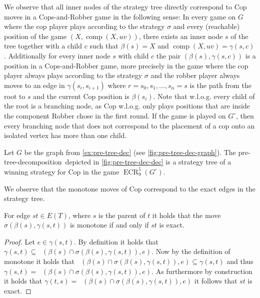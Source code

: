 \documentclass{lmcs}
\theoremstyle{plain}\newtheorem{claim}[thm]{Claim}   %
\DeclareMathOperator{\eCR}{ECR}
\DeclareMathOperator{\escape}{comp}
\DeclareMathOperator{\escapeE}{comp_E}
\newcommand{\complementOf}[1]{\ensuremath{\overline{#1}}}
\newcommand{\complementOfB}[1]{\complementOf{#1}}
\newcommand{\preTreeDec}{pre-tree-decomposition}
\begin{document}
We observe that all inner nodes of the strategy tree directly correspond to Cop moves in a Cops-and-Robber game in the following sense: In every game on $G$ where the cop player plays according to the strategy $\sigma$ and every (reachable) position of the game $(X,\escape(X,uv))$, there exists an inner node $s$ of the tree together with a child $c$ such that $\beta(s)=X$ and $\escape(X,uv)=\gamma(s,c)$.
Additionally for every inner node $s$ with child $c$ the pair $(\beta(s),\gamma(s,c))$ is a position in a Cops-and-Robber game, more precisely in the game where the cop player always plays according to the strategy $\sigma$ and the robber player always moves to an edge in $\gamma(s_i,s_{i+1})$ where $r=s_0,s_1,\ldots,s_\alpha=s$ is the path from the root to $s$ and the current Cop position is $\beta(s_i)$.
Note that w.l.o.g. every child of the root is a branching node, as Cop w.l.o.g. only plays positions that are inside the component Robber chose in the first round.
If the game is played on $G^\circ$, then every branching node that does not correspond to the placement of a cop onto an isolated vertex has more than one child.

\begin{exa}
	Let $G$ be the graph from \autoref{ex:pre-tree-dec} (see \autoref{fig:pre-tree-dec-graph}).
	The \preTreeDec\ depicted in \autoref{fig:pre-tree-dec-dec} is a strategy tree of a winning strategy for Cop in the game $\eCR^5_9(G^\circ)$.
\end{exa}

We observe that the monotone moves of Cop correspond to the exact edges in the strategy tree.

\begin{lem}
	\label{obs:monotone-exact}
	For edge $st \in E(T)$, where $s$ is the parent of $t$ it holds that the move $\sigma(\beta(s),\gamma(s,t))$ is monotone if and only if $st$ is exact.
\end{lem}

\begin{proof}
	Let $e\in \gamma(s,t)$.
	By definition it holds that $\gamma(s,t)\subseteq \escapeE(\beta(s) \cap \sigma(\beta(s), \gamma(s,t)), e)$.
	Now by the definition of monotone it holds that $\escapeE(\beta(s) \cap \sigma(\beta(s), \gamma(s,t)), e) \subseteq \gamma(s,t)$ and thus $\gamma(s,t)= \escapeE(\beta(s) \cap \sigma(\beta(s), \gamma(s,t)), e)$.
	As furthermore by construction it holds that $\gamma(t,s)=\complementOfB{\escapeE(\beta(s) \cap \sigma(\beta(s), \gamma(s,t)), e)}$ it follows that $st$ is exact.
\end{proof}
\end{document}
